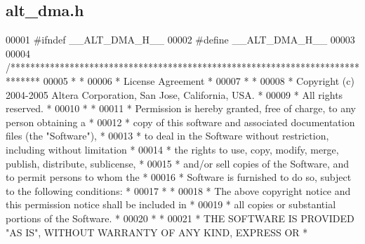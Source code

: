 \subsection{alt\+\_\+dma.\+h}
\label{alt__dma_8h_source}

\begin{DoxyCode}
00001 \textcolor{preprocessor}{#ifndef \_\_ALT\_DMA\_H\_\_}
00002 \textcolor{preprocessor}{#define \_\_ALT\_DMA\_H\_\_}
00003 
00004 \textcolor{comment}{/******************************************************************************}
00005 \textcolor{comment}{*                                                                             *}
00006 \textcolor{comment}{* License Agreement                                                           *}
00007 \textcolor{comment}{*                                                                             *}
00008 \textcolor{comment}{* Copyright (c) 2004-2005 Altera Corporation, San Jose, California, USA.      *}
00009 \textcolor{comment}{* All rights reserved.                                                        *}
00010 \textcolor{comment}{*                                                                             *}
00011 \textcolor{comment}{* Permission is hereby granted, free of charge, to any person obtaining a     *}
00012 \textcolor{comment}{* copy of this software and associated documentation files (the "Software"),  *}
00013 \textcolor{comment}{* to deal in the Software without restriction, including without limitation   *}
00014 \textcolor{comment}{* the rights to use, copy, modify, merge, publish, distribute, sublicense,    *}
00015 \textcolor{comment}{* and/or sell copies of the Software, and to permit persons to whom the       *}
00016 \textcolor{comment}{* Software is furnished to do so, subject to the following conditions:        *}
00017 \textcolor{comment}{*                                                                             *}
00018 \textcolor{comment}{* The above copyright notice and this permission notice shall be included in  *}
00019 \textcolor{comment}{* all copies or substantial portions of the Software.                         *}
00020 \textcolor{comment}{*                                                                             *}
00021 \textcolor{comment}{* THE SOFTWARE IS PROVIDED "AS IS", WITHOUT WARRANTY OF ANY KIND, EXPRESS OR  *}

\end{DoxyCode}

